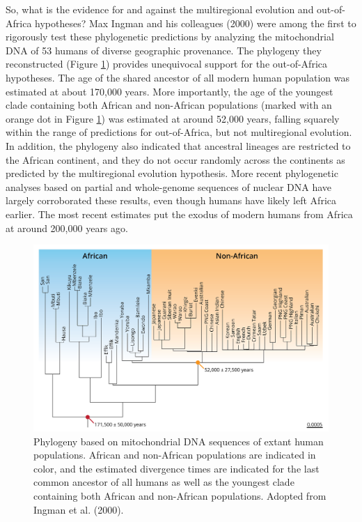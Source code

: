 \documentclass[
]{book}
\begin{document}
So, what is the evidence for and against the multiregional evolution and out-of-Africa hypotheses? Max Ingman and his colleagues (2000) were among the first to rigorously test these phylogenetic predictions by analyzing the mitochondrial DNA of 53 humans of diverse geographic provenance. The phylogeny they reconstructed (Figure \ref{fig:modhuphy}) provides unequivocal support for the out-of-Africa hypotheses. The age of the shared ancestor of all modern human population was estimated at about 170,000 years. More importantly, the age of the youngest clade containing both African and non-African populations (marked with an orange dot in Figure \ref{fig:modhuphy}) was estimated at around 52,000 years, falling squarely within the range of predictions for out-of-Africa, but not multiregional evolution. In addition, the phylogeny also indicated that ancestral lineages are restricted to the African continent, and they do not occur randomly across the continents as predicted by the multiregional evolution hypothesis. More recent phylogenetic analyses based on partial and whole-genome sequences of nuclear DNA have largely corroborated these results, even though humans have likely left Africa earlier. The most recent estimates put the exodus of modern humans from Africa at around 200,000 years ago.

\begin{figure}
\includegraphics[width=1\linewidth]{images/modernhumanphylo} \caption{Phylogeny based on mitochondrial DNA sequences of extant human populations. African and non-African populations are indicated in color, and the estimated divergence times are indicated for the last common ancestor of all humans as well as the youngest clade containing both African and non-African populations. Adopted from Ingman et al. (2000).}\label{fig:modhuphy}
\end{figure}
\end{document}
